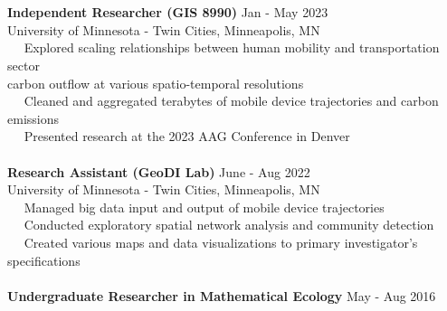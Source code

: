 \documentclass[letterpaper,12pt]{article}
\numberwithin{equation}{section}
\begin{document}
\\\\
\hspace*{1.16in} \textbf{Independent Researcher (GIS 8990)} \hspace*{2.2in} Jan - May 2023\\
\hspace*{1.16in} University of Minnesota - Twin Cities, Minneapolis, MN \vspace*{.1cm}\\
\hspace*{1.2in} \textbullet ~~ Explored scaling relationships between human mobility and transportation sector \\
\hspace*{1.6in} carbon outflow at various spatio-temporal resolutions\\
\hspace*{1.2in} \textbullet ~~ Cleaned and aggregated terabytes of mobile device trajectories and carbon emissions\\
\hspace*{1.2in} \textbullet ~~ Presented research at the 2023 AAG Conference in Denver
\\\\
\hspace*{1.16in} \textbf{Research Assistant (GeoDI Lab)} \hspace*{2.4in} June - Aug 2022\\
\hspace*{1.16in} University of Minnesota - Twin Cities, Minneapolis, MN \vspace*{.1cm}\\
\hspace*{1.2in} \textbullet ~~ Managed big data input and output of mobile device trajectories\\
\hspace*{1.2in} \textbullet ~~ Conducted exploratory spatial network analysis and community detection\\
\hspace*{1.2in} \textbullet ~~ Created various maps and data visualizations to primary investigator's specifications
\\\\
\newpage\noindent
\hspace*{1.16in} \textbf{Undergraduate Researcher in Mathematical Ecology} \hspace*{.76in} May - Aug 2016\\
\end{document}
